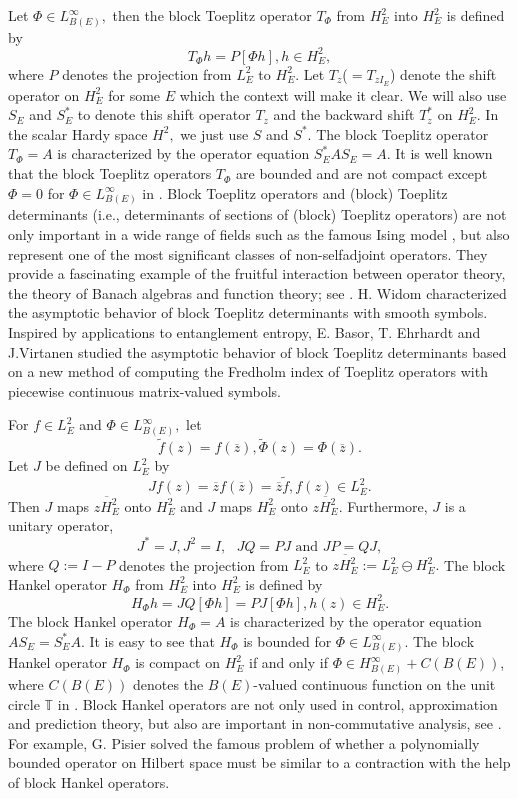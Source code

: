 \documentclass{article}%
\begin{document}
Let $\Phi\in L_{B(E)}^{\infty},$ then the block Toeplitz operator $T_{\Phi}$
from $H_{E}^{2}$ into $H_{E}^{2}$ is defined by%
\[
T_{\Phi}h=P\left[  \Phi h\right]  ,h\in H_{E}^{2},
\]
where $P$ denotes the projection from $L_{E}^{2}$ to $H_{E}^{2}.$ Let $T_{z}%
$($=T_{zI_{E}}$) denote the shift operator on $H_{E}^{2}$ for some $E$ which
the context will make it clear. We will also use $S_{E}$ and $S_{E}^{\ast}$ to
denote this shift operator $T_{z}$ and the backward shift $T_{z}^{\ast}$ on
$H_{E}^{2}.$ In the scalar Hardy space $H^{2},$ we just use $S$ and $S^{\ast}%
$. The block Toeplitz operator $T_{\Phi}=A$ is characterized by the operator
equation $S_{E}^{\ast}AS_{E}=A.$ It is well known that the block Toeplitz
operators $T_{\Phi}$ are bounded and are not compact except $\Phi=0$ for
$\Phi\in L_{B(E)}^{\infty}$ in \cite[Page 103-104]{Peller}. Block Toeplitz operators and
(block) Toeplitz determinants (i.e., determinants of sections of (block)
Toeplitz operators) are not only important in a wide range of fields such as
the famous Ising model \cite{DIK1, DIK2}, but also represent one of the most
significant classes of non-selfadjoint operators. They provide a fascinating
example of the fruitful interaction between operator theory, the theory of
Banach algebras and function theory; see \cite{BS2, Douglas, Zhu2007}.
H. Widom \cite{Widom} characterized the asymptotic behavior of block Toeplitz
determinants with smooth symbols.
Inspired by applications to entanglement entropy, E. Basor, T. Ehrhardt and
J.Virtanen \cite{Basor} studied the asymptotic behavior of block Toeplitz
determinants based on a new method of computing the Fredholm index of Toeplitz
operators with piecewise continuous matrix-valued symbols.

For $f\in L_{E}^{2}$ and $\Phi\in L_{B(E)}^{\infty},$ let%
\[
\widetilde{f}(z)=f(\overline{z}),\widetilde{\Phi}(z)=\Phi(\overline{z}).
\]
Let $J$ be defined on $L_{E}^{2}$ by
\[
Jf(z)=\overline{z}f(\overline{z})=\overline{z}\widetilde{f},f(z)\in L_{E}%
^{2}.
\]
Then $J$ maps $\overline{zH_{E}^{2}}$ onto $H_{E}^{2}$ and $J$ maps $H_{E}%
^{2}$ onto $\overline{zH_{E}^{2}}.$ Furthermore, $J$ is a unitary operator,
\[
J^{\ast}=J,J^{2}=I,\text{ }JQ=PJ \text{ and }JP=QJ,
\]
where $Q:=I-P$ denotes the projection from $L_{E}^{2}$ to $\overline
{zH_{E}^{2}}:=L_{E}^{2}\ominus H_{E}^{2}.$ The block Hankel operator $H_{\Phi
}$ from $H_{E}^{2}$ into $H_{E}^{2}$ is defined by%
\[
H_{\Phi}h=JQ\left[  \Phi h\right]  =PJ\left[  \Phi h\right]  ,h(z)\in
H_{E}^{2}.
\]
The block Hankel operator $H_{\Phi}=A$ is characterized by the operator
equation $AS_{E}=S_{E}^{\ast}A$. It is easy to see that $H_{\Phi}$ is bounded
for $\Phi\in L_{B(E)}^{\infty}.$ The block Hankel operator $H_{\Phi}$ is
compact on $H_{E}^{2}$ if and only if $\Phi\in H_{B(E)}^{\infty}+C(B(E))$,
where $C(B(E))$ denotes the $B(E)$-valued continuous function on the unit
circle $\mathbb{T}$ in \cite{Hartman, Page}. Block Hankel operators are not
only used in control, approximation and prediction theory, but also are
important in non-commutative analysis, see \cite{Par, Peller}. For example, G.
Pisier \cite{pis} solved the famous problem of whether a polynomially bounded
operator on Hilbert space must be similar to a contraction with the help of
block Hankel operators.
\end{document}
